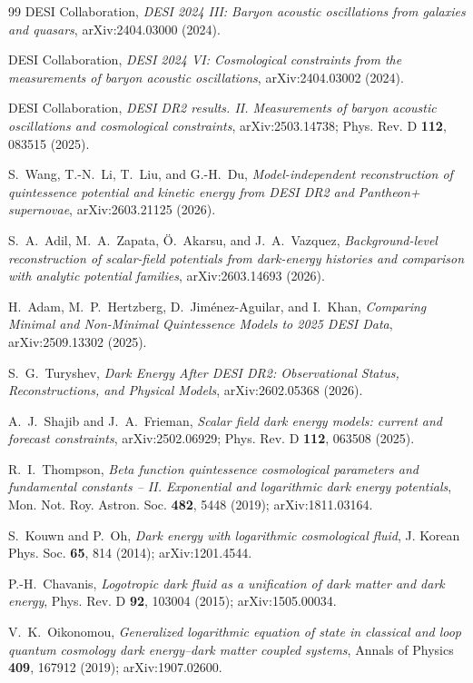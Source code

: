 \documentclass[11pt,reqno]{amsart}
\theoremstyle{plain}
\theoremstyle{definition}
\theoremstyle{remark}
\begin{document}
\begin{thebibliography}{99}
DESI Collaboration,
\emph{DESI 2024 III: Baryon acoustic oscillations from galaxies and quasars},
arXiv:2404.03000 (2024).

DESI Collaboration,
\emph{DESI 2024 VI: Cosmological constraints from the measurements of baryon acoustic oscillations},
arXiv:2404.03002 (2024).

DESI Collaboration,
\emph{DESI DR2 results. II. Measurements of baryon acoustic oscillations and cosmological constraints},
arXiv:2503.14738; Phys. Rev. D \textbf{112}, 083515 (2025).

S.~Wang, T.-N.~Li, T.~Liu, and G.-H.~Du,
\emph{Model-independent reconstruction of quintessence potential and kinetic energy from DESI DR2 and Pantheon+ supernovae},
arXiv:2603.21125 (2026).

S.~A.~Adil, M.~A.~Zapata, \"{O}.~Akarsu, and J.~A.~Vazquez,
\emph{Background-level reconstruction of scalar-field potentials from dark-energy histories and comparison with analytic potential families},
arXiv:2603.14693 (2026).

H.~Adam, M.~P.~Hertzberg, D.~Jim\'enez-Aguilar, and I.~Khan,
\emph{Comparing Minimal and Non-Minimal Quintessence Models to 2025 DESI Data},
arXiv:2509.13302 (2025).

S.~G.~Turyshev,
\emph{Dark Energy After DESI DR2: Observational Status, Reconstructions, and Physical Models},
arXiv:2602.05368 (2026).

A.~J.~Shajib and J.~A.~Frieman,
\emph{Scalar field dark energy models: current and forecast constraints},
arXiv:2502.06929; Phys. Rev. D \textbf{112}, 063508 (2025).

R.~I.~Thompson,
\emph{Beta function quintessence cosmological parameters and fundamental
constants -- II. Exponential and logarithmic dark energy potentials},
Mon. Not. Roy. Astron. Soc. \textbf{482}, 5448 (2019); arXiv:1811.03164.

S.~Kouwn and P.~Oh,
\emph{Dark energy with logarithmic cosmological fluid},
J. Korean Phys. Soc. \textbf{65}, 814 (2014); arXiv:1201.4544.

P.-H.~Chavanis,
\emph{Logotropic dark fluid as a unification of dark matter and dark energy},
Phys. Rev. D \textbf{92}, 103004 (2015); arXiv:1505.00034.

V.~K.~Oikonomou,
\emph{Generalized logarithmic equation of state in classical and loop
quantum cosmology dark energy--dark matter coupled systems},
Annals of Physics \textbf{409}, 167912 (2019); arXiv:1907.02600.


\end{thebibliography}
\end{document}
